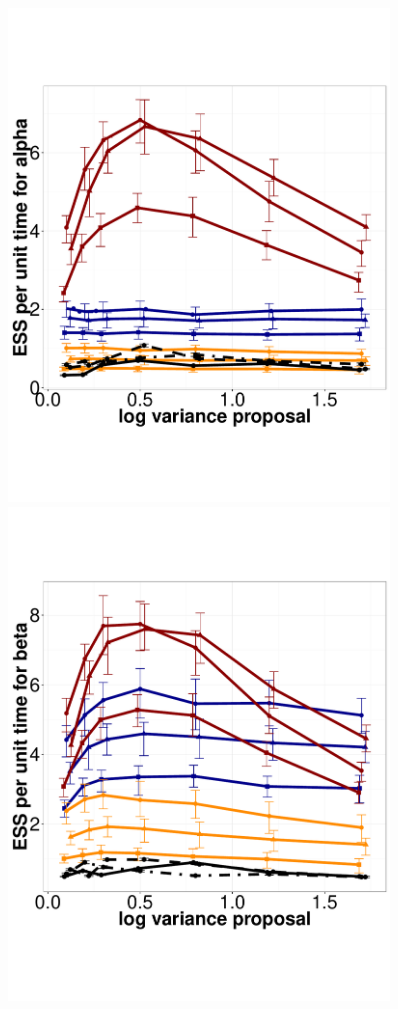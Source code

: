   \begin{figure}%
  \centering
  \begin{minipage}[!hp]{0.45\linewidth}
  \centering
    \includegraphics [width=0.90\textwidth, angle=0]{figs/exp_5_alpha.pdf}
      \end{minipage}
  \begin{minipage}[hp]{0.45\linewidth}
  \centering
    \includegraphics [width=0.90\textwidth, angle=0]{figs/exp_5_beta.pdf}

\end{minipage}
\end{figure}
